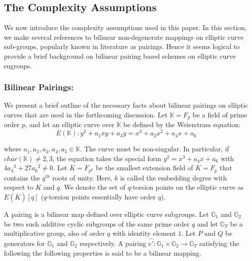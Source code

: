 \subsection{The Complexity Assumptions}

We now introduce the complexity assumptions used in this paper. In this section, we make several references to bilinear non-degenerate mappings on elliptic curve sub-groups, popularly known in literature as pairings. Hence it seems logical to provide a brief background on bilinear pairing based schemes on elliptic curve sugroups.

\subsubsection{Bilinear Pairings:}

We  present a brief outline of the necessary facts about bilinear pairings on elliptic curves that are used in the forthcoming discussion. Let $\mathbb{K}=F_{p}$ be a field of prime order $p$, and let an elliptic curve over $\mathbb{K}$ be defined by the Weierstrass \cite{miller1986use} equation:
\begin{equation*}
 E(\mathbb{K}) : y^2 + a_1xy + a_3y = x^3 + a_2x^2 + a_4x + a_6
\end{equation*}

where $a_1, a_2, a_3, a_4, a_5 \in \mathbb{K}$. The curve must be non-singular. In particular, if $char(\mathbb{K})\neq2,3$, the equation takes the special form $y^2=x^3+a_4x+a_6$ with $4{a_4}^3+27{a_6}^2\neq0$. Let $\overline{K} = F_{p^k}$ be the smallest extension field of $K=F_p$ that contains the $q^{th}$ roots of unity. Here, $k$ is called the embedding degree with respect to $K$ and $q$. We denote the set of $q$-torsion points on the elliptic curve as $E(\overline{K})[q]$ ($q$-torsion points essentially have order $q$).

A pairing is a bilinear map defined over elliptic curve subgroups. Let $\mathbb{G}_{1}$ and $\mathbb{G}_{2}$ be two such additive cyclic subgroups of the same prime order $q$ and let $\mathbb{G}_{T}$ be a multiplicative group, also of order $q$ with identity element $1$. Let $P$ and $Q$ be generators for $\mathbb{G}_1$ and $\mathbb{G}_2$ respectively. A pairing $\hat{e'}:\mathbb{G}_1 \times \mathbb{G}_2\longrightarrow\mathbb{G}_T$ satisfying the following the following properties is said to be a bilinear mapping. 

